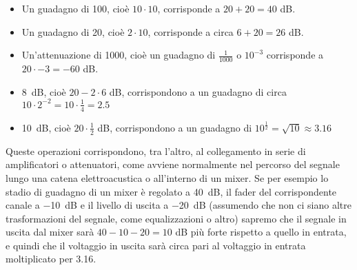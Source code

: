 \begin{itemize}

\item Un guadagno di 100, cioè $10 \cdot 10$, corrisponde a $20 + 20 = 40$ dB.

\item Un guadagno di 20, cioè $2 \cdot 10$, corrisponde a circa $6 + 20 = 26$ dB.

\item Un'attenuazione di 1000, cioè un guadagno di $\frac{1}{1000}$ o $10^{-3}$ corrisponde a $20 \cdot -3 = -60$ dB.

\item \qty{8}{dB}, cioè $20 - 2 \cdot 6$ dB, corrispondono a un guadagno di circa $10 \cdot 2^{-2} = 10 \cdot \frac{1}{4} = 2.5$

\item \qty{10}{dB}, cioè $20 \cdot \frac{1}{2}$ dB, corrispondono a un guadagno di $10^\frac{1}{2} = \sqrt{10} \approx {3.16}$

\end{itemize}

Queste operazioni corrispondono, tra l'altro, al collegamento in serie di amplificatori o attenuatori, come avviene normalmente nel percorso del segnale lungo una catena elettroacustica o all'interno di un mixer. Se per esempio lo stadio di guadagno di un mixer è regolato a \qty{40}{dB}, il fader del corrispondente canale a \qty{-10}{dB} e il livello di uscita a \qty{-20}{dB} (assumendo che non ci siano altre trasformazioni del segnale, come equalizzazioni o altro) sapremo che il segnale in uscita dal mixer sarà $40-10-20 = 10$ dB più forte rispetto a quello in entrata, e quindi che il voltaggio in uscita sarà circa pari al voltaggio in entrata moltiplicato per 3.16.



  